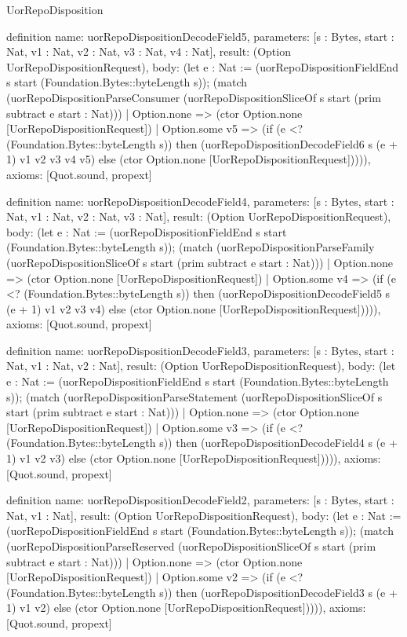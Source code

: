 \begin{lexlean}{UorRepoDisposition}
\begin{semanticmodule}
definition{
  name: uorRepoDispositionDecodeField5,
  parameters: [s : Bytes, start : Nat, v1 : Nat, v2 : Nat, v3 : Nat, v4 : Nat],
  result: (Option UorRepoDispositionRequest),
  body: (let e : Nat := (uorRepoDispositionFieldEnd s start (Foundation.Bytes::byteLength s)); (match (uorRepoDispositionParseConsumer (uorRepoDispositionSliceOf s start (prim subtract e start : Nat)))
    | Option.none => (ctor Option.none [UorRepoDispositionRequest])
    | Option.some v5 => (if (e <? (Foundation.Bytes::byteLength s)) then (uorRepoDispositionDecodeField6 s (e + 1) v1 v2 v3 v4 v5) else (ctor Option.none [UorRepoDispositionRequest])))),
  axioms: [Quot.sound, propext]
}

definition{
  name: uorRepoDispositionDecodeField4,
  parameters: [s : Bytes, start : Nat, v1 : Nat, v2 : Nat, v3 : Nat],
  result: (Option UorRepoDispositionRequest),
  body: (let e : Nat := (uorRepoDispositionFieldEnd s start (Foundation.Bytes::byteLength s)); (match (uorRepoDispositionParseFamily (uorRepoDispositionSliceOf s start (prim subtract e start : Nat)))
    | Option.none => (ctor Option.none [UorRepoDispositionRequest])
    | Option.some v4 => (if (e <? (Foundation.Bytes::byteLength s)) then (uorRepoDispositionDecodeField5 s (e + 1) v1 v2 v3 v4) else (ctor Option.none [UorRepoDispositionRequest])))),
  axioms: [Quot.sound, propext]
}

definition{
  name: uorRepoDispositionDecodeField3,
  parameters: [s : Bytes, start : Nat, v1 : Nat, v2 : Nat],
  result: (Option UorRepoDispositionRequest),
  body: (let e : Nat := (uorRepoDispositionFieldEnd s start (Foundation.Bytes::byteLength s)); (match (uorRepoDispositionParseStatement (uorRepoDispositionSliceOf s start (prim subtract e start : Nat)))
    | Option.none => (ctor Option.none [UorRepoDispositionRequest])
    | Option.some v3 => (if (e <? (Foundation.Bytes::byteLength s)) then (uorRepoDispositionDecodeField4 s (e + 1) v1 v2 v3) else (ctor Option.none [UorRepoDispositionRequest])))),
  axioms: [Quot.sound, propext]
}

definition{
  name: uorRepoDispositionDecodeField2,
  parameters: [s : Bytes, start : Nat, v1 : Nat],
  result: (Option UorRepoDispositionRequest),
  body: (let e : Nat := (uorRepoDispositionFieldEnd s start (Foundation.Bytes::byteLength s)); (match (uorRepoDispositionParseReserved (uorRepoDispositionSliceOf s start (prim subtract e start : Nat)))
    | Option.none => (ctor Option.none [UorRepoDispositionRequest])
    | Option.some v2 => (if (e <? (Foundation.Bytes::byteLength s)) then (uorRepoDispositionDecodeField3 s (e + 1) v1 v2) else (ctor Option.none [UorRepoDispositionRequest])))),
  axioms: [Quot.sound, propext]
}


\end{semanticmodule}
\end{lexlean}

